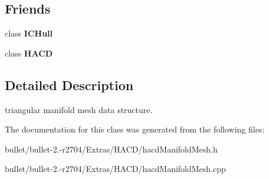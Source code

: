 \subsection*{Friends}
\begin{DoxyCompactItemize}
\item 
\hypertarget{class_h_a_c_d_1_1_t_m_mesh_af8c54a3b946020c72439a823fc62e570}{class {\bfseries I\+C\+Hull}}\label{class_h_a_c_d_1_1_t_m_mesh_af8c54a3b946020c72439a823fc62e570}

\item 
\hypertarget{class_h_a_c_d_1_1_t_m_mesh_ab3497bc7797561d0c79ecef2f462e43a}{class {\bfseries H\+A\+C\+D}}\label{class_h_a_c_d_1_1_t_m_mesh_ab3497bc7797561d0c79ecef2f462e43a}

\end{DoxyCompactItemize}


\subsection{Detailed Description}
triangular manifold mesh data structure. 

The documentation for this class was generated from the following files\+:\begin{DoxyCompactItemize}
\item 
bullet/bullet-\/2.-\/r2704/\+Extras/\+H\+A\+C\+D/hacd\+Manifold\+Mesh.\+h\item 
bullet/bullet-\/2.-\/r2704/\+Extras/\+H\+A\+C\+D/hacd\+Manifold\+Mesh.\+cpp\end{DoxyCompactItemize}
